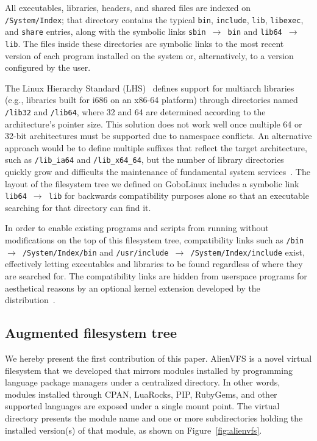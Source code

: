 \documentclass[sigplan, anonymous, 10pt]{acmart}
\begin{document}
All executables, libraries, headers, and shared files are indexed on \texttt{/System/Index};
that directory contains the typical \texttt{bin}, \texttt{include}, \texttt{lib}, \texttt{libexec},
and \texttt{share} entries, along with the symbolic links \texttt{sbin $\rightarrow$ bin} and
\texttt{lib64 $\rightarrow$ lib}. The files inside these directories are symbolic links to the
most recent version of each program installed on the system or, alternatively, to a version
configured by the user.

The Linux Hierarchy Standard (LHS)~\cite{lsb2015:fhs} defines support for
multiarch libraries (e.g., libraries built for i686 on an x86-64 platform)
through directories named \texttt{/lib32} and \texttt{/lib64},
where 32 and 64 are determined according to the architecture's pointer size.
This solution does not work well once multiple 64 or 32-bit architectures must
be supported due to namespace conflicts. An alternative approach would be to define
multiple suffixes that reflect the target architecture, such as \texttt{/lib\_ia64}
and \texttt{/lib\_x64\_64}, but the number of library directories quickly grow and
difficults the maintenance of fundamental system services~\cite{heen2005:thesis}.
The layout of the filesystem tree we defined on GoboLinux includes a symbolic link
\texttt{lib64 $\rightarrow$ lib} for backwards compatibility purposes alone so that
an executable searching for that directory can find it.

In order to enable existing programs and scripts from running without modifications on
the top of this filesystem tree, compatibility links such as
\texttt{/bin $\rightarrow$ /System/Index/bin} and
\texttt{/usr/include $\rightarrow$ /System/Index/include} exist, effectively letting
executables and libraries to be found regardless of where they are searched for.
The compatibility links are hidden from userspace programs for aesthetical reasons
by an optional kernel extension developed by the distribution~\cite{GoboHide}.

\subsection{Augmented filesystem tree}
We hereby present the first contribution of this paper. AlienVFS is a novel virtual
filesystem that we developed that mirrors modules installed by programming language
package managers under a centralized directory. In other words, modules installed
through CPAN, LuaRocks, PIP, RubyGems, and other supported languages are exposed under
a single mount point. The virtual directory presents the module name and one or more
subdirectories holding the installed version(s) of that module, as shown on
Figure~\ref{fig:alienvfs}.
\end{document}

